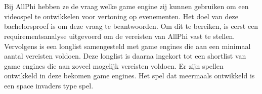 
%
%
%
%
%

%




\chapter*{}

Bij AllPhi hebben ze de vraag welke game engine zij kunnen gebruiken om een videospel te ontwikkelen voor vertoning op evenementen. Het doel van deze bachelorsproef is om deze vraag te beantwoorden. Om dit te bereiken, is eerst een requirementsanalyse uitgevoerd om de vereisten van AllPhi vast te stellen. Vervolgens is een longlist samengesteld met game engines die aan een minimaal aantal vereisten voldoen. Deze longlist is daarna ingekort tot een shortlist van game engines die aan zoveel mogelijk vereisten voldoen. Er zijn spellen ontwikkeld in deze bekomen game engines. Het spel dat meermaals ontwikkeld is een space invaders type spel.
